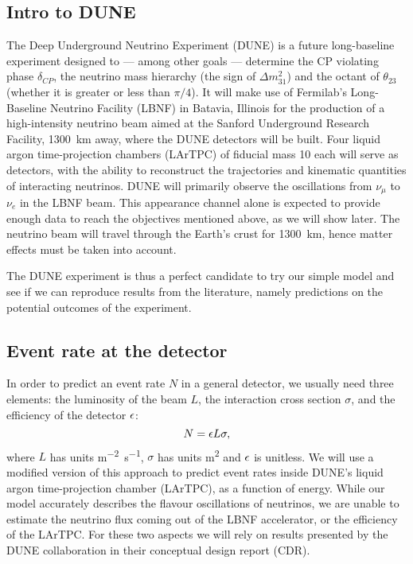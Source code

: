 \subsection{Intro to DUNE}
The Deep Underground Neutrino Experiment (DUNE) is a future long-baseline
experiment designed to --- among other goals --- determine the CP violating phase
$\delta_{CP}$, the neutrino mass hierarchy (the sign of $\Delta m^2_{31}$) and
the octant of $\theta_{23}$ (whether it is greater or less than 
$\pi/4$)\cite{cdr}. 
It will make use of Fermilab's Long-Baseline Neutrino Facility (LBNF) in Batavia,
Illinois for the production of a high-intensity neutrino beam aimed at the
Sanford Underground Research Facility, \SI{1300}{\km} away, where the DUNE
detectors will be built.
Four liquid argon time-projection chambers (LArTPC) of fiducial mass
\SI{10}{\kt} each will serve as detectors, with the ability to reconstruct the
trajectories and kinematic quantities of interacting neutrinos.
DUNE will primarily observe the oscillations from $\nu_\mu$ to $\nu_e$ in the
LBNF beam. This appearance channel alone is expected to provide enough data to
reach the objectives mentioned above, as we will show later.
The neutrino beam will travel through the Earth's crust for \SI{1300}{\km},
hence matter effects must be taken into account.

The DUNE experiment is thus a perfect candidate to try our simple model and see if
we can reproduce results from the literature, namely predictions on the
potential outcomes of the experiment.

\subsection{Event rate at the detector}
In order to predict an event rate $N$ in a general detector, we usually need three
elements: the luminosity of the beam $L$, the interaction cross section $\sigma$, and the
efficiency of the detector $\epsilon$:
\begin{equation}N = \epsilon L \sigma,\label{eq:rate}\end{equation}
where $L$ has units \si{\m^{-2} \s^{-1}}, $\sigma$ has units \si{\m^2} and
$\epsilon$ is unitless.
We will use a modified version of this approach to predict event rates inside
DUNE's liquid argon time-projection chamber (LArTPC), as a function of
energy. While our model
accurately describes the flavour oscillations of neutrinos, we are unable to
estimate the neutrino flux coming out of the LBNF accelerator, or the
efficiency of the LArTPC. For these two aspects we will rely on results
presented by the DUNE collaboration in their conceptual design report (CDR).

